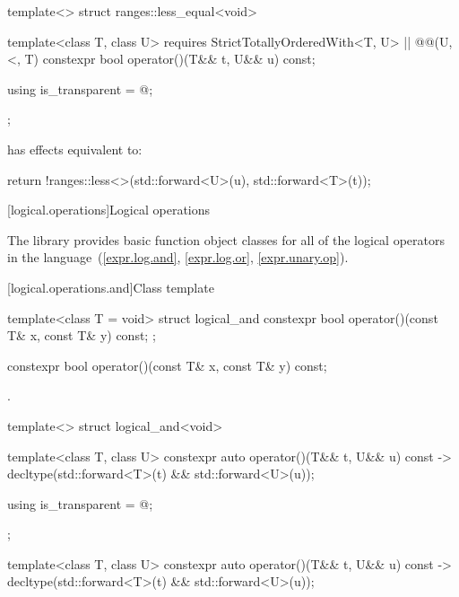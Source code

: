 %
\begin{itemdecl}
template<> struct ranges::less_equal<void> {
  template<class T, class U>
    requires StrictTotallyOrderedWith<T, U> || @@(U, <, T)
  constexpr bool operator()(T&& t, U&& u) const;

  using is_transparent = @\unspecnc@;
};
\end{itemdecl}

\begin{itemdescr}
\pnum
{} has effects equivalent to:
\begin{codeblock}
return !ranges::less<>{}(std::forward<U>(u), std::forward<T>(t));
\end{codeblock}
\end{itemdescr}

[logical.operations]{Logical operations}

\pnum
The library provides basic function object classes for all of the logical
operators in the language~(\ref{expr.log.and}, \ref{expr.log.or}, \ref{expr.unary.op}).

[logical.operations.and]{Class template }

%
\begin{itemdecl}
template<class T = void> struct logical_and {
  constexpr bool operator()(const T& x, const T& y) const;
};
\end{itemdecl}

%
\begin{itemdecl}
constexpr bool operator()(const T& x, const T& y) const;
\end{itemdecl}

\begin{itemdescr}
\pnum\returns {}.
\end{itemdescr}

%
\begin{itemdecl}
template<> struct logical_and<void> {
  template<class T, class U> constexpr auto operator()(T&& t, U&& u) const
    -> decltype(std::forward<T>(t) && std::forward<U>(u));

  using is_transparent = @\unspec@;
};
\end{itemdecl}

%
\begin{itemdecl}
template<class T, class U> constexpr auto operator()(T&& t, U&& u) const
    -> decltype(std::forward<T>(t) && std::forward<U>(u));
\end{itemdecl}

